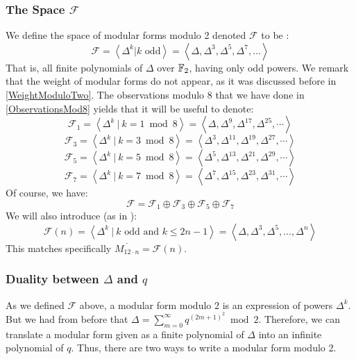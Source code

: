\subsubsection{The Space $\mathcal{F}$}
\label{ModularFormsModTwo}
We define the space of modular forms modulo 2 denoted $\mathcal{F} $ to be \cite[2.1]{OrdreNilpotenceOperateurHecke}:
$$
\mathcal{F}
= \left\langle \Delta^k | k \text{ odd} \right\rangle
= \left\langle \Delta, \Delta^3, \Delta^5, \Delta^7, \dots \right\rangle 
$$
That is, all finite polynomials of $\Delta$ over $\mathbb{F}_2$, having only odd powers.
We remark that the weight of modular forms do not appear, as it was discussed before in \ref{WeightModuloTwo}.
The observations modulo 8 that we have done in \ref{ObservationsMod8} yields that it will be useful to denote:
$$
\mathcal{F}_1
= \left\langle \Delta^k \ | \ k = 1 \bmod 8 \right\rangle
= \left\langle \Delta, \Delta^9, \Delta^{17}, \Delta^{25}, \cdots \right\rangle
$$
$$
\mathcal{F}_3
= \left\langle \Delta^k \ | \ k = 3 \bmod 8 \right\rangle
= \left\langle \Delta^3, \Delta^{11}, \Delta^{19}, \Delta^{27}, \cdots \right\rangle
$$
$$
\mathcal{F}_5
= \left\langle \Delta^k \ | \ k = 5 \bmod 8 \right\rangle
= \left\langle \Delta^5, \Delta^{13}, \Delta^{21}, \Delta^{29}, \cdots \right\rangle
$$
$$
\mathcal{F}_7
= \left\langle \Delta^k \ | \ k = 7 \bmod 8 \right\rangle
= \left\langle \Delta^7, \Delta^{15}, \Delta^{23}, \Delta^{31}, \cdots \right\rangle
$$
Of course, we have:
$$
\mathcal{F} = \mathcal{F}_1 \oplus \mathcal{F}_3 \oplus \mathcal{F}_5 \oplus \mathcal{F}_7
$$
We will also introduce (as in \cite[2.]{StructureAlgebreHecke}):
$$
\mathcal{F}(n)
= \left\langle \Delta^k \ | \ k \text{ odd} \text{ and } k \leq 2n-1 \right\rangle
= \left\langle \Delta, \Delta^3, \Delta^5, \dots, \Delta^n \right\rangle
$$
This matches specifically $\overline{M_{12 \cdot n}} = \mathcal{F}(n)$.

\subsubsection{Duality between $\Delta$ and $q$}
As we defined $\mathcal{F}$ above, a modular form modulo 2 is an expression of powers $\Delta^k$.
But we had from before that $\Delta = \sum_{m=0}^{\infty} q^{(2m+1)^2} \bmod 2$.
Therefore, we can translate a modular form given as a finite polynomial of $\Delta$ into an infinite polynomial of $q$.
Thus, there are two ways to write a modular form modulo 2.

